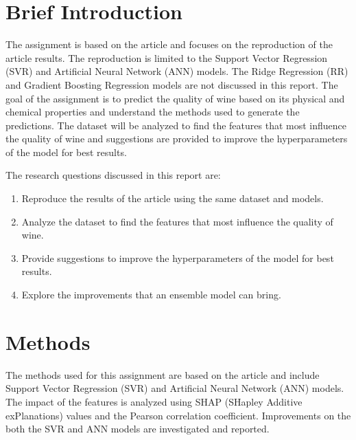 \documentclass{article}
\begin{document}

\section{Brief Introduction}
The assignment is based on the article \cite{dahal2021prediction} and focuses on the reproduction of the article results.
The reproduction is limited to the Support Vector Regression (SVR) and Artificial Neural Network (ANN) models.
The Ridge Regression (RR) and Gradient Boosting Regression models are not discussed in this report.
The goal of the assignment is to predict the quality of wine based on its physical and chemical properties and understand the methods used to generate the predictions.
The dataset will be analyzed to find the features that most influence the quality of wine and suggestions are provided to improve the hyperparameters of the model for best results.

The research questions discussed in this report are:
\begin{enumerate}
    \item Reproduce the results of the article \cite{dahal2021prediction} using the same dataset and models.
    \item Analyze the dataset to find the features that most influence the quality of wine.
    \item Provide suggestions to improve the hyperparameters of the model for best results.
	\item Explore the improvements that an ensemble model can bring.
\end{enumerate}

\section{Methods}
The methods used for this assignment are based on the article \cite{dahal2021prediction} and include Support Vector Regression (SVR) and Artificial Neural Network (ANN) models.
The impact of the features is analyzed using SHAP (SHapley Additive exPlanations) values and the Pearson correlation coefficient. Improvements on the both the SVR and ANN models are investigated and reported.
\end{document}
